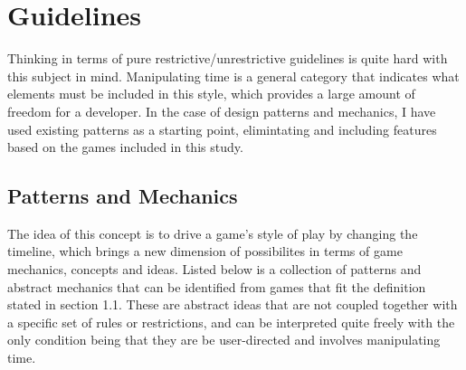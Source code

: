 
\chapter{Guidelines}

Thinking in terms of pure restrictive/unrestrictive guidelines is quite hard with this subject in mind. Manipulating time is a general category that indicates what elements must be included in this style, which provides a large amount of freedom for a developer. In the case of design patterns and mechanics, I have used existing patterns as a starting point, elimintating and including features based on the games included in this study. 

\section{Patterns and Mechanics}

The idea of this concept is to drive a game's style of play by changing the timeline, which brings a new dimension of possibilites in terms of game mechanics, concepts and ideas. Listed below is a collection of patterns and abstract mechanics that can be identified from games that fit the definition stated in section 1.1. These are abstract ideas that are not coupled together with a specific set of rules or restrictions, and can be interpreted quite freely with the only condition being that they are be user-directed and involves manipulating time. 



